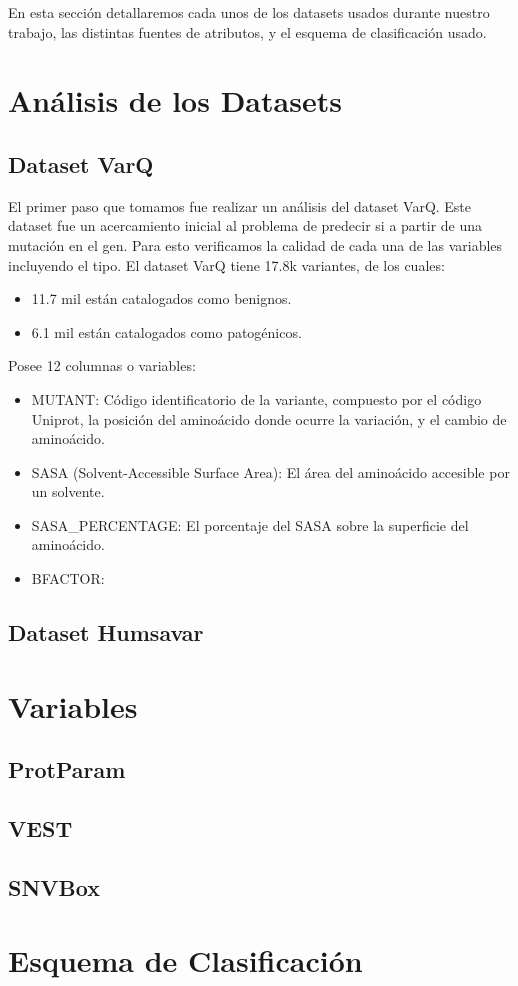 En esta sección detallaremos cada unos de los datasets usados durante nuestro trabajo, las distintas fuentes de atributos, y el esquema de clasificación usado.

\section{Análisis de los Datasets}

\subsection{Dataset VarQ}

El primer paso que tomamos fue realizar un análisis del dataset VarQ. Este dataset fue un acercamiento inicial al problema de predecir si a partir de una mutación en el gen. Para esto verificamos la calidad de cada una de las variables incluyendo el tipo. El dataset VarQ tiene 17.8k variantes, de los cuales:

\begin{itemize}
    \item 11.7 mil están catalogados como benignos.
    \item 6.1 mil están catalogados como patogénicos.
\end{itemize}

Posee 12 columnas o variables: 

\begin{itemize}
    \item MUTANT: Código identificatorio de la variante, compuesto por el código Uniprot, la posición del aminoácido donde ocurre la variación, y el cambio de aminoácido.
    \item SASA (Solvent-Accessible Surface Area): El área del aminoácido accesible por un solvente.
    \item SASA\_PERCENTAGE: El porcentaje del SASA sobre la superficie del aminoácido.
    \item BFACTOR: 
    
\end{itemize}

\subsection{Dataset Humsavar}


\section{Variables}

\subsection{ProtParam}

\subsection{VEST}

\subsection{SNVBox}


\section{Esquema de Clasificación}